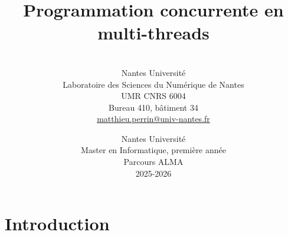 
\title[Programmation concurrente en multi-threads]{Programmation concurrente en multi-threads}

\author[Matthieu Perrin]{
  \\[2mm]
  Nantes Université\\
  Laboratoire des Sciences du Numérique de Nantes \\
  UMR CNRS 6004\\
  Bureau 410, bâtiment 34 \\
  \url{matthieu.perrin@univ-nantes.fr}\\
}

\date{
  Nantes Université\\
  Master en Informatique, première année\\
  Parcours ALMA\\
  2025-2026
}



\begin{frame}
  \titlepage
\end{frame}

\part{Introduction}

